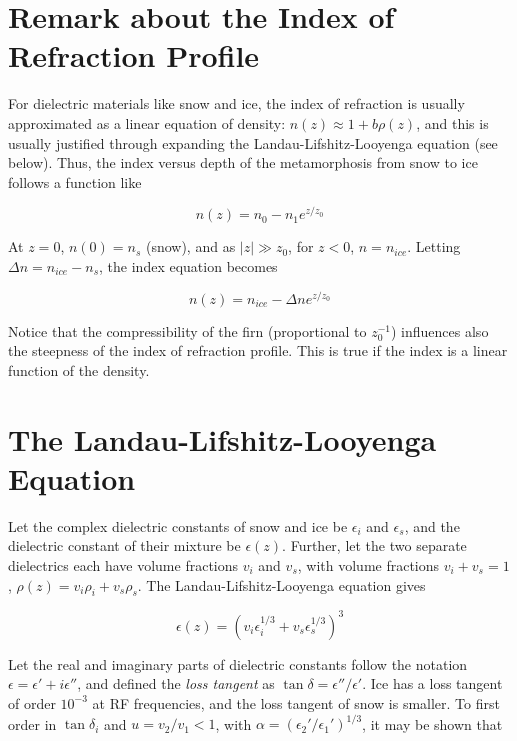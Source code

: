 \documentclass[12pt]{article}
\begin{document}
\section{Remark about the Index of Refraction Profile}

For dielectric materials like snow and ice, the index of refraction is usually approximated as a linear equation of density: $n(z) \approx 1+b\rho(z)$, and this is usually justified through expanding the Landau-Lifshitz-Looyenga equation (see below).  Thus, the index versus depth of the metamorphosis from snow to ice follows a function like

\begin{equation}
n(z) = n_{0} - n_1 e^{z/z_0}
\end{equation}

At $z=0$, $n(0) = n_s$ (snow), and as $|z| \gg z_0$, for $z<0$, $n = n_{ice}$.  Letting $\Delta n = n_{ice} - n_{s}$, the index equation becomes

\begin{equation}
\boxed{
n(z) = n_{ice} - \Delta n e^{z/z_0}
}
\label{eq:n}
\end{equation}

Notice that the compressibility of the firn (proportional to $z_0^{-1}$) influences also the steepness of the index of refraction profile.  This is true if the index is a linear function of the density.

\section{The Landau-Lifshitz-Looyenga Equation}

Let the complex dielectric constants of snow and ice be $\epsilon_i$ and $\epsilon_s$, and the dielectric constant of their mixture be $\epsilon(z)$. Further, let the two separate dielectrics each have volume fractions $v_i$ and $v_s$, with volume fractions $v_i + v_s = 1$, $\rho(z) = v_i \rho_i + v_s \rho_s$.  The Landau-Lifshitz-Looyenga equation gives

\begin{equation}
\epsilon(z) = \left( v_i \epsilon_i^{1/3} + v_s \epsilon_s^{1/3} \right)^3
\end{equation}

Let the real and imaginary parts of dielectric constants follow the notation $\epsilon = \epsilon' + i \epsilon''$, and defined the \textit{loss tangent} as $\tan\delta = \epsilon''/\epsilon'$.  Ice has a loss tangent of order $10^{-3}$ at RF frequencies, and the loss tangent of snow is smaller.  To first order in $\tan\delta_i$ and $u = v_2/v_1 < 1$, with $\alpha = (\epsilon_2'/\epsilon_1')^{1/3}$, it may be shown that
\end{document}
